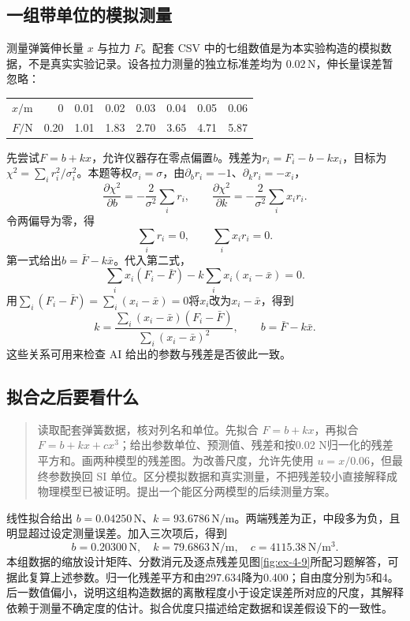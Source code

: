 \documentclass[11pt,openany,fontset=fandol]{ctexbook}
\theoremstyle{plain}\newtheorem{theorem}{定理}[chapter]\newtheorem{proposition}[theorem]{命题}
\theoremstyle{definition}\newtheorem{definition}{定义}[chapter]\newtheorem{example}{例}[chapter]
\theoremstyle{remark}\newtheorem*{remark}{说明}
\begin{document}
\subsection{一组带单位的模拟测量}
测量弹簧伸长量 $x$ 与拉力 $F$。配套 CSV 中的七组数值是为本实验构造的模拟数据，不是真实实验记录。设各拉力测量的独立标准差均为 $0.02\,\mathrm N$，伸长量误差暂忽略：
\begin{center}\small
\begin{tabular}{rrrrrrrr}\toprule
$x/\mathrm m$&0&0.01&0.02&0.03&0.04&0.05&0.06\\
$F/\mathrm N$&0.20&1.01&1.83&2.70&3.65&4.71&5.87\\\bottomrule
\end{tabular}\end{center}
先尝试$F=b+kx$，允许仪器存在零点偏置$b$。残差为$r_i=F_i-b-kx_i$，目标为$\chi^2=\sum_i r_i^2/\sigma_i^2$。本题等权$\sigma_i=\sigma$，由$\partial_b r_i=-1$、$\partial_k r_i=-x_i$，
\[\frac{\partial\chi^2}{\partial b}
=-\frac2{\sigma^2}\sum_i r_i,\qquad
\frac{\partial\chi^2}{\partial k}
=-\frac2{\sigma^2}\sum_i x_ir_i.\]
令两偏导为零，得
\[
\sum_i r_i=0,\qquad\sum_i x_ir_i=0.
\]
第一式给出$b=\bar F-k\bar x$。代入第二式，
\[\sum_i x_i(F_i-\bar F)-k\sum_i x_i(x_i-\bar x)=0.\]
用$\sum_i(F_i-\bar F)=\sum_i(x_i-\bar x)=0$将$x_i$改为$x_i-\bar x$，得到
\[
k=\frac{\sum_i(x_i-\bar x)(F_i-\bar F)}{\sum_i(x_i-\bar x)^2},\qquad b=\bar F-k\bar x.
\]
这些关系可用来检查 AI 给出的参数与残差是否彼此一致。

\subsection{拟合之后要看什么}
\begin{quote}\small
读取配套弹簧数据，核对列名和单位。先拟合 $F=b+kx$，再拟合 $F=b+kx+cx^3$；给出参数单位、预测值、残差和按0.02 N归一化的残差平方和。画两种模型的残差图。为改善尺度，允许先使用 $u=x/0.06$，但最终参数换回 SI 单位。区分模拟数据和真实测量，不把残差较小直接解释成物理模型已被证明。提出一个能区分两模型的后续测量方案。
\end{quote}

线性拟合给出 $b=0.04250\,\mathrm N$、$k=93.6786\,\mathrm{N/m}$。两端残差为正，中段多为负，且明显超过设定测量误差。加入三次项后，得到
\[
b=0.20300\,\mathrm N,\quad k=79.6863\,\mathrm{N/m},\quad
c=4115.38\,\mathrm{N/m^3}.
\]
本组数据的缩放设计矩阵、分数消元及逐点残差见图\ref{fig:ex-4-9}所配习题解答，可据此复算上述参数。归一化残差平方和由297.634降为0.400；自由度分别为5和4。后一数值偏小，说明这组构造数据的离散程度小于设定误差所对应的尺度，其解释依赖于测量不确定度的估计。拟合优度只描述给定数据和误差假设下的一致性。
\end{document}
